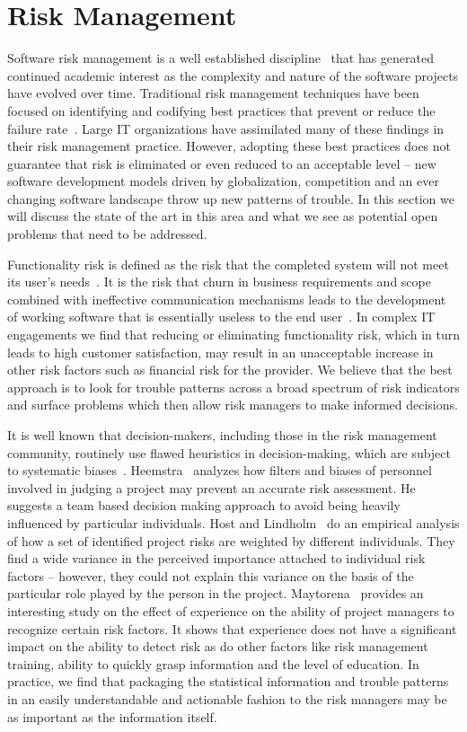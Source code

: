 \section{Risk Management}

Software risk management is a well established discipline~\cite{risk1,risk2} that has generated continued academic interest as the complexity and nature of the software projects have evolved over time. Traditional risk management techniques have been focused on identifying and codifying best practices that prevent or reduce the failure rate~\cite{risk3,risk4,risk5,risk6,risk7}. Large IT organizations have assimilated many of these findings in their risk management practice.  However, adopting these best practices does not guarantee that risk is eliminated or even reduced to an acceptable level -- new software development models driven by globalization, competition and an ever changing software landscape throw up new patterns of trouble. In this section we will discuss the state of the art in this area and what we see as potential open problems that need to be addressed.

Functionality risk is defined as the risk that the completed system will not meet its user's needs~\cite{risk11}.  It is the risk that churn in business requirements and scope combined with ineffective communication mechanisms leads to the development of working software that is essentially useless to the end user~\cite{risk12}. In complex IT engagements we find that reducing or eliminating functionality risk, which in turn leads to high customer satisfaction, may result in an unacceptable increase in other risk factors such as financial risk for the provider. We believe that the best approach is to look for trouble patterns across a broad spectrum of risk indicators and surface problems which then allow risk managers to make informed decisions.

It is well known that decision-makers, including those in the risk management community, routinely use flawed heuristics in decision-making, which are subject to systematic biases~\cite{risk27}. Heemstra~\cite{risk24} analyzes how filters and biases of personnel involved in judging a project may prevent an accurate risk assessment. He suggests a team based decision making approach to avoid being heavily influenced by particular individuals. Host and Lindholm~\cite{risk25}  do an empirical analysis of how a set of identified project risks are weighted by different individuals. They find a wide variance in the perceived importance attached to individual risk factors -- however, they could not explain this variance on the basis of the particular role played by the person in the project. Maytorena~\cite{risk26} provides an interesting study on the effect of experience on the ability of project managers to recognize certain risk factors. It shows that experience does not have a significant impact on the ability to detect risk as do other factors like risk management training, ability to quickly grasp information and the level of education. In practice, we find that packaging the statistical information and trouble patterns in an easily understandable and actionable fashion to the risk managers may be as important as the information itself. 

